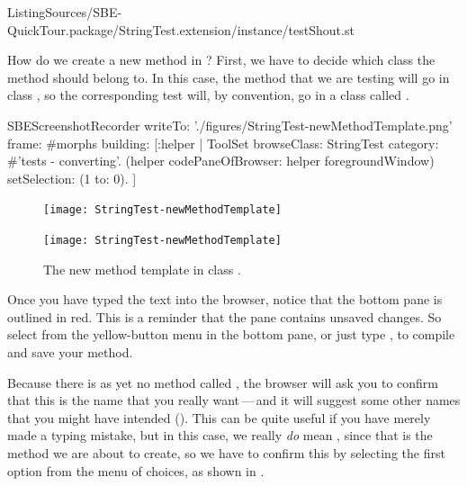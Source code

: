 \documentclass[a4paper,10pt,twoside]{book}
\begin{document}
%
{ListingSources/SBE-QuickTour.package/StringTest.extension/instance/testShout.st}

How do we create a new method in \sq?
First, we have to decide which class the method should belong to.
In this case, the  method that we are testing will go in class , so the corresponding test will, by convention, go in a class called .

\begin{ExecuteSmalltalkScript}
SBEScreenshotRecorder writeTo: './figures/StringTest-newMethodTemplate.png' frame: #morphs building: [:helper |
	ToolSet browseClass: StringTest category: #'tests - converting'.
	(helper codePaneOfBrowser: helper foregroundWindow) setSelection: (1 to: 0).
]
\end{ExecuteSmalltalkScript}


\begin{figure}[hbt]
\ifluluelse
	{\centerline {\texttt{[image: StringTest-newMethodTemplate]}}}
	{\centerline {\texttt{[image: StringTest-newMethodTemplate]}}}
\caption{The new method template in class .
\label{fig:newMethodTemplate}}
\end{figure}

Once you have typed the text into the browser, notice that the bottom pane is outlined in red.
This is a reminder that the pane contains unsaved changes.
So select  from the yellow-button menu in the bottom pane, or just type , to compile and save your method.

Because there is as yet no method called , the browser will ask you to confirm that this is the name that you really want\,---\,and it will suggest some other names that you might have intended ().
This can be quite useful if you have merely made a typing mistake, but in this case, we really \emph{do} mean , since that is the method we are about to create, so we have to confirm this by selecting the first option from the menu of choices, as shown in .
\end{document}
